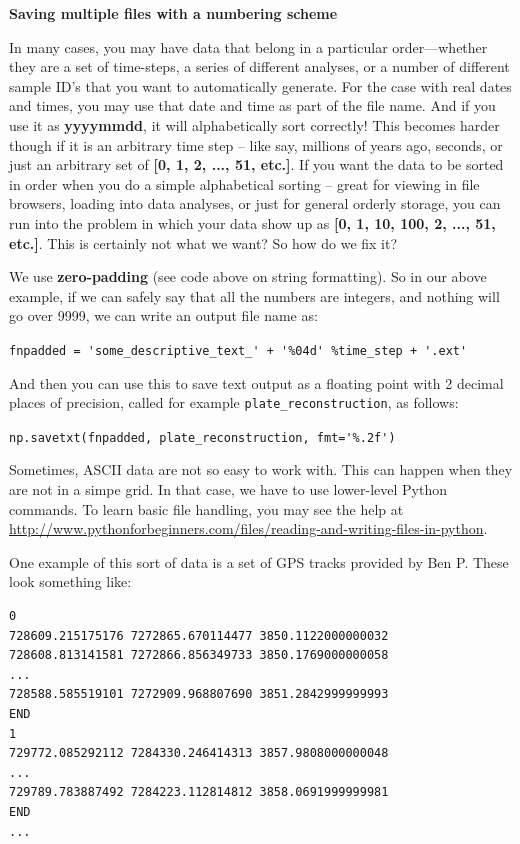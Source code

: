 \documentclass[a4paper,10pt]{scrartcl}
\begin{document}
\begin{framed}
\noindent\textbf{Saving multiple files with a numbering scheme}

In many cases, you may have data that belong in a particular order---whether they are a set of time-steps, a series of different analyses, or a number of different sample ID's that you want to automatically generate. For the case with real dates and times, you may use that date and time as part of the file name. And if you use it as \textbf{yyyymmdd}, it will alphabetically sort correctly! This becomes harder though if it is an arbitrary time step -- like say, millions of years ago, seconds, or just an arbitrary set of \textbf{[0, 1, 2, ..., 51, etc.]}. If you want the data to be sorted in order when you do a simple alphabetical sorting -- great for viewing in file browsers, loading into data analyses, or just for general orderly storage, you can run into the problem in which your data show up as \textbf{[0, 1, 10, 100, 2, ..., 51, etc.]}. This is certainly not what we want? So how do we fix it?

We use \textbf{zero-padding} (see code above on string formatting). So in our above example, if we can safely say that all the numbers are integers, and nothing will go over 9999, we can write an output file name as:

\lstinline{fnpadded = 'some_descriptive_text_' + '%04d' %time_step + '.ext'}

And then you can use this to save text output as a floating point with 2 decimal places of precision, called for example \lstinline{plate_reconstruction}, as follows:

\lstinline{np.savetxt(fnpadded, plate_reconstruction, fmt='%.2f')}

\end{framed}

Sometimes, ASCII data are not so easy to work with. This can happen when they are not in a simpe grid. In that case, we have to use lower-level Python commands. To learn basic file handling, you may see the help at \url{http://www.pythonforbeginners.com/files/reading-and-writing-files-in-python}.

One example of this sort of data is a set of GPS tracks provided by Ben P. These look something like:

\begin{lstlisting}
0
728609.215175176 7272865.670114477 3850.1122000000032
728608.813141581 7272866.856349733 3850.1769000000058
...
728588.585519101 7272909.968807690 3851.2842999999993
END
1
729772.085292112 7284330.246414313 3857.9808000000048
...
729789.783887492 7284223.112814812 3858.0691999999981
END
...
\end{lstlisting}
\end{document}
